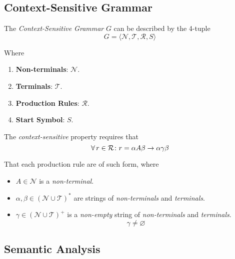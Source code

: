 \subsection{Context-Sensitive Grammar}

\begin{definition}
    The \textit{Context-Sensitive Grammar} $G$ can be described by the 4-tuple
    \begin{equation}
        G = \langle
            \mathcal{N},
            \mathcal{T},
            \mathcal{R},
            S
        \rangle
    \end{equation}
    
    Where
    \begin{enumerate}
        \item \textbf{Non-terminals}: $\mathcal{N}$.
        \item \textbf{Terminals}: $\mathcal{T}$.
        \item \textbf{Production Rules}: $\mathcal{R}$.
        \item \textbf{Start Symbol}: $S$.
    \end{enumerate}
    
    The \textit{context-sensitive} property requires that
    \begin{equation}
        \operatorname{\forall} r \in \mathcal{R} \colon r = \alpha A \beta \to \alpha \gamma \beta
    \end{equation}
    
    That each production rule are of such form, where
    \begin{itemize}
        \item $A \in \mathcal{N}$ is a \textit{non-terminal}.
        \item $\alpha, \beta \in (\mathcal{N} \cup \mathcal{T})^\ast$ are strings of \textit{non-terminals} and \textit{terminals}.
        \item $\gamma \in (\mathcal{N} \cup \mathcal{T})^+$ is a \textit{non-empty} string of \textit{non-terminals} and \textit{terminals}.
        \begin{equation}
            \gamma \ne \varnothing
        \end{equation}
    \end{itemize}
\end{definition}

\subsection{Semantic Analysis}

